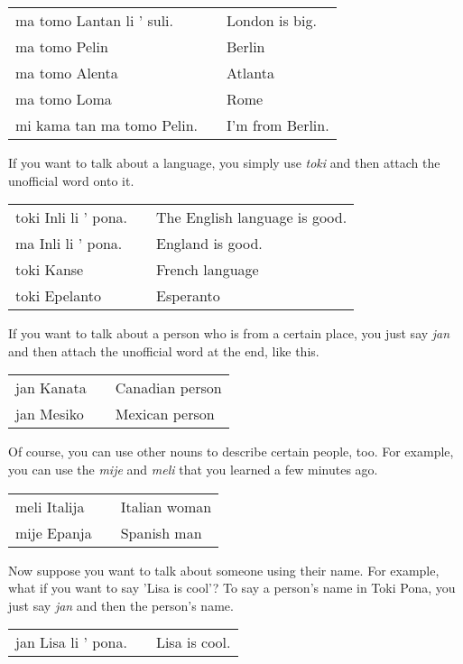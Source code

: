 \begin{supertabular}{p{5,5cm}|ll}
ma tomo Lantan li ' suli. && London is big. \\
ma tomo Pelin && Berlin \\
ma tomo Alenta && Atlanta \\
ma tomo Loma && Rome \\
mi kama tan ma tomo Pelin. && I'm from Berlin. \\
\end{supertabular} 

If you want to talk about a language, you simply use \textit{toki} and then attach the unofficial word onto it. 

\begin{supertabular}{p{5,5cm}|ll}
toki Inli li ' pona. && The English language is good. \\
ma Inli li ' pona. && England is good. \\
toki Kanse && French language \\
toki Epelanto && Esperanto \\
\end{supertabular} 

If you want to talk about a person who is from a certain place, you just say \textit{jan} and then attach the unofficial word at the end, like this. 

\begin{supertabular}{p{5,5cm}|ll}
jan Kanata && Canadian person \\
jan Mesiko && Mexican person \\
\end{supertabular} 

Of course, you can use other nouns to describe certain people, too. 
For example, you can use the \textit{mije} and \textit{meli} that you learned a few minutes ago. 

\begin{supertabular}{p{5,5cm}|ll}
meli Italija && Italian woman \\
mije Epanja && Spanish man \\
\end{supertabular} 

Now suppose you want to talk about someone using their name. 
For example, what if you want to say 'Lisa is cool'? 
To say a person's name in Toki Pona, you just say \textit{jan} and then the person's name. 

\begin{supertabular}{p{5,5cm}|ll}
jan Lisa li ' pona. && Lisa is cool. \\
\end{supertabular} 

